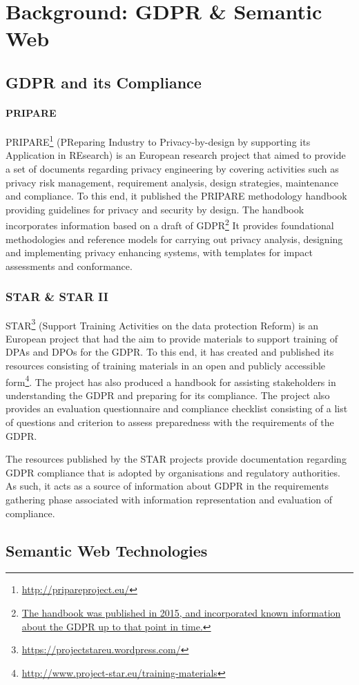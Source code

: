 \chapter{Background: GDPR \& Semantic Web}
\label{chapter:background}

\section{GDPR and its Compliance}\label{sec:background:GDPR}

\subsubsection{PRIPARE}
PRIPARE\footnote{\url{http://pripareproject.eu/}} (PReparing Industry to Privacy-by-design by supporting its Application in REsearch) is an European research project that aimed to provide a set of documents regarding privacy engineering by covering activities such as privacy risk management, requirement analysis, design strategies, maintenance and compliance. To this end, it published the PRIPARE methodology handbook \cite{noauthor_pripare-methodology-handbook-final-feb-24-2016.pdf_nodate} providing guidelines for privacy and security by design. The handbook incorporates information based on a draft of GDPR\footnote{\url{The handbook was published in 2015, and incorporated known information about the GDPR up to that point in time.}} It provides foundational methodologies and reference models for carrying out privacy analysis, designing and implementing privacy enhancing systems, with templates for impact assessments and conformance. 

\subsection{STAR \& STAR II}
STAR\footnote{\url{https://projectstareu.wordpress.com/}} (Support Training Activities on the data protection Reform) is an European project that had the aim to provide materials to support training of DPAs and DPOs for the GDPR. To this end, it has created and published its resources consisting of training materials in an open and publicly accessible form\footnote{\url{http://www.project-star.eu/training-materials}}. The project has also produced a handbook for assisting stakeholders in understanding the GDPR and preparing for its compliance. The project also provides an evaluation questionnaire and compliance checklist \cite{noauthor_gdpr_2019-1}consisting of a list of questions and criterion to assess preparedness with the requirements of the GDPR. 

The resources published by the STAR projects provide documentation regarding GDPR compliance that is adopted by organisations and regulatory authorities. As such, it acts as a source of information about GDPR in the requirements gathering phase associated with information representation and evaluation of compliance.

\section{Semantic Web Technologies}\label{sec:background:semweb}